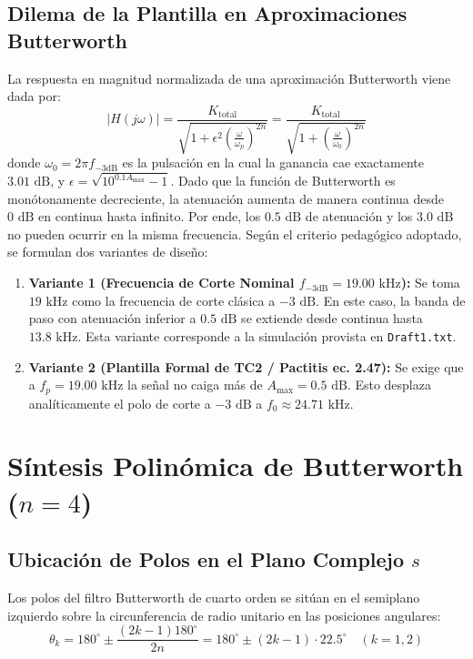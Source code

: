 \documentclass[a4paper,11pt]{article}
\begin{document}
\subsection{Dilema de la Plantilla en Aproximaciones Butterworth}
La respuesta en magnitud normalizada de una aproximación Butterworth viene dada por:
\begin{equation}
|H(j\omega)| = \frac{K_{\text{total}}}{\sqrt{1 + \epsilon^2 \left(\frac{\omega}{\omega_p}\right)^{2n}}} = \frac{K_{\text{total}}}{\sqrt{1 + \left(\frac{\omega}{\omega_0}\right)^{2n}}}
\end{equation}
donde $\omega_0 = 2\pi f_{-3\text{dB}}$ es la pulsación en la cual la ganancia cae exactamente $3.01\text{ dB}$, y $\epsilon = \sqrt{10^{0.1 A_{\max}} - 1}$. 
Dado que la función de Butterworth es monótonamente decreciente, la atenuación aumenta de manera continua desde $0\text{ dB}$ en continua hasta infinito. Por ende, los $0.5\text{ dB}$ de atenuación y los $3.0\text{ dB}$ no pueden ocurrir en la misma frecuencia. Según el criterio pedagógico adoptado, se formulan dos variantes de diseño:

\begin{enumerate}
    \item \textbf{Variante 1 (Frecuencia de Corte Nominal $f_{-3\text{dB}} = 19.00\text{ kHz}$):} Se toma $19\text{ kHz}$ como la frecuencia de corte clásica a $-3\text{ dB}$. En este caso, la banda de paso con atenuación inferior a $0.5\text{ dB}$ se extiende desde continua hasta $13.8\text{ kHz}$. Esta variante corresponde a la simulación provista en \texttt{Draft1.txt}.
    \item \textbf{Variante 2 (Plantilla Formal de TC2 / Pactitis ec. 2.47):} Se exige que a $f_p = 19.00\text{ kHz}$ la señal no caiga más de $A_{\max} = 0.5\text{ dB}$. Esto desplaza analíticamente el polo de corte a $-3\text{ dB}$ a $f_0 \approx 24.71\text{ kHz}$.
\end{enumerate}

\section{Síntesis Polinómica de Butterworth ($n = 4$)}

\subsection{Ubicación de Polos en el Plano Complejo $s$}
Los polos del filtro Butterworth de cuarto orden se sitúan en el semiplano izquierdo sobre la circunferencia de radio unitario en las posiciones angulares:
\begin{equation}
\theta_k = 180^\circ \pm \frac{(2k - 1)180^\circ}{2n} = 180^\circ \pm (2k - 1) \cdot 22.5^\circ \quad (k = 1, 2)
\end{equation}
\end{document}
